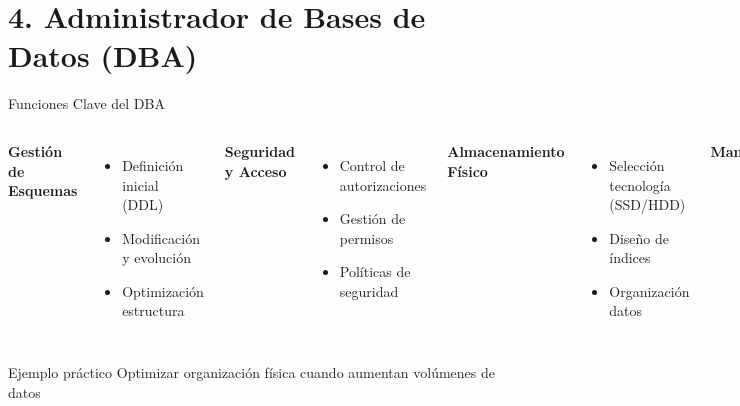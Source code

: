 \documentclass{beamer}
\begin{document}
\section{4. Administrador de Bases de Datos (DBA)}
\begin{frame}{Funciones Clave del DBA}
\begin{columns}[T]
\textbf{Gestión de Esquemas}
\begin{itemize}
    \item Definición inicial (DDL)
    \item Modificación y evolución
    \item Optimización estructura
\end{itemize}

\textbf{Seguridad y Acceso}
\begin{itemize}
    \item Control de autorizaciones
    \item Gestión de permisos
    \item Políticas de seguridad
\end{itemize}

\textbf{Almacenamiento Físico}
\begin{itemize}
    \item Selección tecnología (SSD/HDD)
    \item Diseño de índices
    \item Organización datos
\end{itemize}

\textbf{Mantenimiento}
\begin{itemize}
    \item \alert{Respaldos periódicos}
    \item Gestión de espacio
    \item Monitoreo rendimiento
\end{itemize}
\end{columns}

\begin{exampleblock}{Ejemplo práctico}
Optimizar organización física cuando aumentan volúmenes de datos
\end{exampleblock}
\end{frame}
\end{document}
